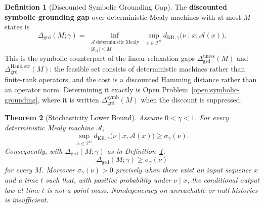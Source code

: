 \documentclass[12pt]{article}
\newtheorem{theorem}{Theorem}[section]
\theoremstyle{definition}
\newtheorem{definition}[theorem]{Definition}
\newcommand{\Dunres}{\Delta_{\mathrm{grd}}^{\mathrm{unres}}}
\newcommand{\DHankstr}{\Delta_{\mathrm{grd}}^{\mathrm{Hank,str}}}
\begin{document}
\begin{definition}[Discounted Symbolic Grounding Gap]
\label{def:symbolic-grounding-gap}
The \textbf{discounted symbolic grounding gap} over deterministic Mealy
machines with at most $M$ states is
\[
\Delta_{\mathrm{grd}}(M;\gamma)
=
\inf_{\substack{
\mathcal A\ \text{deterministic Mealy}\\
|\mathcal S_{\mathcal A}|\le M
}}
\ \sup_{x\in\mathcal I^{\mathbb N}}
d_{\mathrm{KR},\gamma}
\bigl(
\nu\mid x,\mathcal A(x)
\bigr).
\]
This is the symbolic counterpart of the linear relaxation gaps
$\Dunres(M)$ and $\DHankstr(M)$: the feasible set consists of deterministic
machines rather than finite-rank operators, and the cost is a discounted
Hamming distance rather than an operator norm.  Determining it exactly is
Open Problem~\ref{open:symbolic-grounding}, where it is written
$\Delta_{\mathrm{grd}}^{\mathrm{symb}}(M)$ when the discount is suppressed.
\end{definition}

\begin{theorem}[Stochasticity Lower Bound]
\label{thm:stochasticity}
Assume $0<\gamma<1$.  For every deterministic Mealy machine $\mathcal A$,
\[
\sup_{x\in\mathcal I^{\mathbb N}}
d_{\mathrm{KR},\gamma}
\bigl(
\nu\mid x,\mathcal A(x)
\bigr)
\ge
\sigma_\gamma(\nu).
\]
Consequently, with $\Delta_{\mathrm{grd}}(M;\gamma)$ as in
Definition~\ref{def:symbolic-grounding-gap},
\[
\Delta_{\mathrm{grd}}(M;\gamma)
\ge
\sigma_\gamma(\nu)
\]
for every $M$.  Moreover $\sigma_\gamma(\nu)>0$ precisely when there exist an
input sequence $x$ and a time $t$ such that, with positive probability under
$\nu\mid x$, the conditional output law at time $t$ is not a point mass.
Nondegeneracy on unreachable or null histories is insufficient.
\end{theorem}
\end{document}
